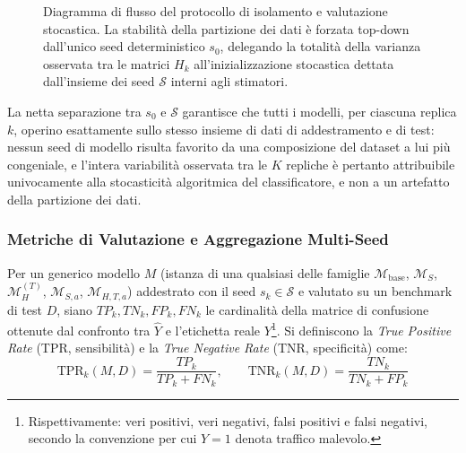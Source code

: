 \begin{figure}[H]
    \caption{Diagramma di flusso del protocollo di isolamento e valutazione stocastica. La stabilità della partizione dei dati è forzata top-down dall'unico seed deterministico $s_0$, delegando la totalità della varianza osservata tra le matrici $H_k$ all'inizializzazione stocastica dettata dall'insieme dei seed $\mathcal{S}$ interni agli stimatori.}
    \label{fig:multiseed_protocol}
\end{figure}

La netta separazione tra $s_0$ e $\mathcal{S}$ garantisce che tutti i modelli, per ciascuna replica $k$, operino esattamente sullo stesso insieme di dati di addestramento e di test: nessun seed di modello risulta favorito da una composizione del dataset a lui più congeniale, e l'intera variabilità osservata tra le $K$ repliche è pertanto attribuibile univocamente alla stocasticità algoritmica del classificatore, e non a un artefatto della partizione dei dati.

\subsubsection{Metriche di Valutazione e Aggregazione Multi-Seed}
\label{subsubsec:metriche_aggregazione}
Per un generico modello $M$ (istanza di una qualsiasi delle famiglie $\mathcal{M}_{\text{base}}$, $\mathcal{M}_S$, $\mathcal{M}_H^{(T)}$, $\mathcal{M}_{S,a}$, $\mathcal{M}_{H,T,a}$) addestrato con il seed $s_k \in \mathcal{S}$ e valutato su un benchmark di test $D$, siano $TP_k, TN_k, FP_k, FN_k$ le cardinalità della matrice di confusione ottenute dal confronto tra $\hat{Y}$ e l'etichetta reale $Y$\footnote{Rispettivamente: veri positivi, veri negativi, falsi positivi e falsi negativi, secondo la convenzione per cui $Y=1$ denota traffico malevolo.}. Si definiscono la \textit{True Positive Rate} (TPR, sensibilità) e la \textit{True Negative Rate} (TNR, specificità) come:
\begin{equation}
    \text{TPR}_k(M, D) = \frac{TP_k}{TP_k + FN_k}, \qquad \text{TNR}_k(M, D) = \frac{TN_k}{TN_k + FP_k}
    \label{eq:tpr_tnr_def}
\end{equation}

